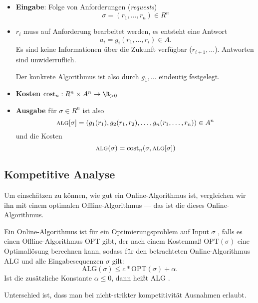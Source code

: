 \begin{itemize}
  \item \textbf{Eingabe}: Folge von Anforderungen (\emph{requests})
  \begin{equation*}
    \sigma = \left( r_1,\dots, r_n \right) \in R^n
  \end{equation*}
  \item \( r_i \) muss auf Anforderung bearbeitet werden, es entsteht eine Antwort
  \begin{equation*}
    a_i = g_i(r_1, \dots,r_i) \in A\text{.}
  \end{equation*}
  Es sind keine Informationen über die Zukunft verfügbar (\( r_{i+1},\dots \)). Antworten sind unwiderruflich.

  Der konkrete Algorithmus ist also durch \( g_1,\dots \) eindeutig festgelegt.

  \item \textbf{Kosten} \( \text{cost}_n : R^n \times A^n \to \R_{> 0} \)

  \item \textbf{Ausgabe} für \( \sigma \in R^n \) ist also
  \begin{equation*}
    \textsc{alg}[\sigma] = \left( g_1(r_1),g_2(r_1,r_2),\dots,g_n(r_1,\dots,r_n) \right) \in A^n
  \end{equation*}
  und die Kosten
  \begin{equation*}
    \textsc{alg}(\sigma) = \text{cost}_n(\sigma,\textsc{alg}[\sigma])
  \end{equation*}
\end{itemize}

\subsection{Kompetitive Analyse}

Um einschätzen zu können, wie gut ein Online-Algorithmus ist, vergleichen wir ihn mit einem optimalen Offline-Algorithmus --- das ist die  dieses Online-Algorithmus.

\begin{definition}[c-kompetitiv]
  Ein Online-Algorithmus ist für ein Optimierungsproblem auf Input \( \sigma \) , falls es einen Offline-Algorithmus OPT gibt, der nach einem Kostenmaß \( \text{OPT}(\sigma) \) eine Optimallösung berechnen kann, sodass für den betrachteten Online-Algorithmus ALG und alle Eingabesequenzen \( \sigma \) gilt:
  \begin{equation*}
    \text{ALG}(\sigma) \leq c*\text{OPT}(\sigma) + \alpha\text{.}
  \end{equation*}
  Ist die zusätzliche Konstante \( \alpha \leq 0 \), dann heißt ALG . 

  Unterschied ist, dass man bei nicht-strikter kompetitivität Ausnahmen erlaubt.
\end{definition}

